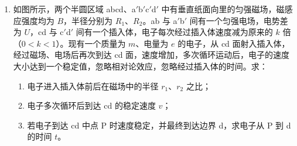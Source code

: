 \documentclass[\gkver]{gaokaozhenti}
\begin{document}
\begin{enumerate}
{整个过程由能量守恒得电动机消耗的总电能转化为物块增加的机械能和摩擦产生的内能，故可知 $E_{2} = E_{1} + \mu mg\cos\theta\cdot L$

故可得 $\frac{E_{1}}{E_{2}} = \frac{mgL\sin\theta}{mgL\sin\theta + \mu mgL\cos\theta} = \frac{\sin\theta}{\sin\theta + \mu\cos\theta}$
}

\item
如图所示，两个半圆区域 abcd、a$'$b$'$c$'$d$'$ 中有垂直纸面向里的匀强磁场，磁感应强度均为 $B$，半径分别为 $R_{1}$、$R_{2}$。ab 与 a$'$b$'$ 间有一个匀强电场，电势差为 $U$，cd 与 c$'$d$'$ 间有一个插入体，电子每次经过插入体速度减为原来的 $k$ 倍（$0<k<1$）。现有一个质量为 $m$、电量为 $e$ 的电子，从 cd 面射入插入体，经过磁场、电场后再次到达 cd 面，速度增加，多次循环运动后，电子的速度大小达到一个稳定值，忽略相对论效应，忽略经过插入体的时间。求：
\begin{enumerate}
	\item
	电子进入插入体前后在磁场中的半径 $r_{1}$、$r_{2}$ 之比；
	\item
	电子多次循环后到达 cd 的稳定速度 $v$；
	\item
	若电子到达 cd 中点 P 时速度稳定，并最终到达边界 d，求电子从 P 到 d 的时间 $t$。
\end{enumerate}
\end{enumerate}
\end{document}
